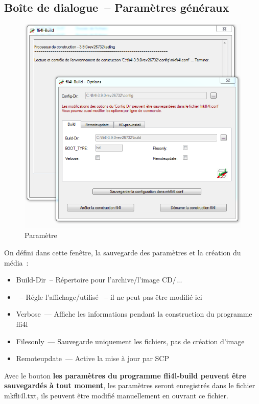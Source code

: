   \subsection{Boîte de dialogue~-- Paramètres généraux}
  \begin{figure}[h!]
  \centering
  \includegraphics[width=\columnwidth]{win_build_build}
  \caption{Paramètre}
  \label{fig:win_build_build}
  \end{figure}

  On défini dans cette fenêtre, la sauvegarde des paramètres et la création du média~:
  \begin{itemize}
    \item Build-Dir~-- Répertoire pour l'archive/l'image CD/...
    \item {}~-- Régle l'affichage/utilisé ~-- il ne peut pas être modifié ici
    \item Verbose~--- Affiche les informations pendant la construction du programme fli4l
    \item Filesonly~--- Sauvegarde uniquement les fichiers, pas de création d'image
    \item Remoteupdate~--- Active la mise à jour par SCP
  \end{itemize}

  Avec le bouton \textbf{les paramètres du programme fli4l-build peuvent être sauvegardés à tout moment},
       les paramètres seront enregistrés dans le fichier mkfli4l.txt, ils
       peuvent être modifié manuellement en ouvrant ce fichier.


